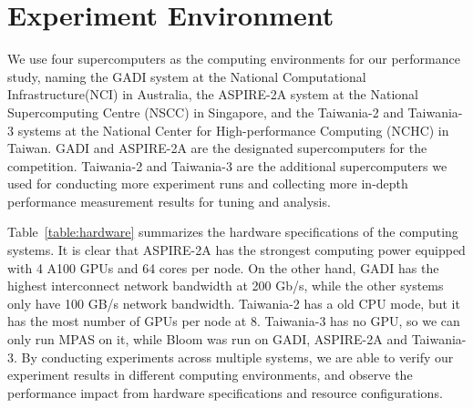 \section{Experiment Environment}
\label{sec:setup}

We use four supercomputers as the computing environments for our performance study, naming the GADI system at the National Computational Infrastructure(NCI) in Australia, the ASPIRE-2A system at the National Supercomputing Centre (NSCC) in Singapore, and the Taiwania-2 and Taiwania-3 systems at the National Center for High-performance Computing (NCHC) in Taiwan. GADI and ASPIRE-2A are the designated supercomputers for the competition. Taiwania-2 and Taiwania-3 are the additional supercomputers we used for conducting more experiment runs and collecting more in-depth performance measurement results for tuning and analysis.  



Table~\ref{table:hardware} summarizes the hardware specifications of the computing systems. It is clear that ASPIRE-2A has the strongest computing power equipped with 4 A100 GPUs and 64 cores per node. On the other hand, GADI has the highest interconnect network bandwidth at 200 Gb/s, while the other systems only have 100 GB/s network bandwidth. Taiwania-2 has a old CPU mode, but it has the most number of GPUs per node at 8. Taiwania-3 has no GPU, so we can only run MPAS on it, while Bloom was run on GADI, ASPIRE-2A and Taiwania-3. By conducting experiments across multiple systems, we are able to verify our experiment results in different computing environments, and observe the performance impact from hardware specifications and resource configurations. 



